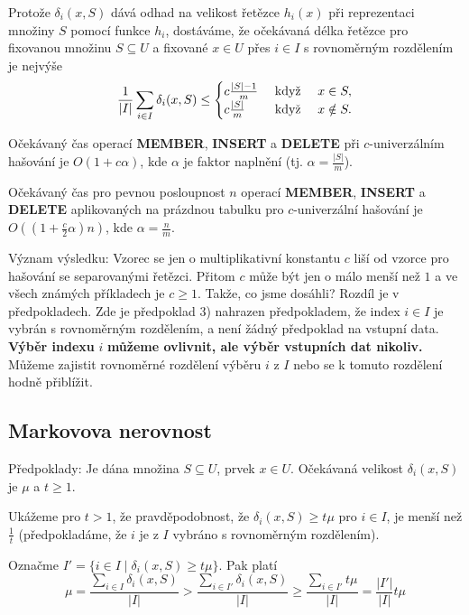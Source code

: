 \documentclass[a4paper,12pt]{article}
\begin{document}
Protože $\delta_i(x,S)$ dává odhad na velikost řetězce $
h_i(x)$ při 
repre\-zentaci množiny $S$ pomocí funkce $h_i$, dostáváme, že 
očekávaná délka řetězce pro fixovanou množinu  
$S\subseteq U$ a fixované $x\in U$ přes $i\in I$ s rovnoměrným 
rozdělením je nejvýše
$$\frac 1{|I|}\sum_{i\in I}\delta_i(x,S)\le\begin{cases} c\frac {|S|-1}m&\text{\rm\ když }
\quad x\in S,\\
c\frac {|S|}m&\text{\rm\ když }\quad x\notin S.\end{cases} $$

\begin{veta}Očekávaný čas operací {\bf MEMBER}, {\bf INSERT }
a {\bf DE\-LETE} při $c$-univerzálním hašování je $
O(1+c\alpha )$, kde 
$\alpha$ je faktor napl\-nění (tj. $\alpha =\frac {|S|}m$).

Očekávaný čas pro pevnou posloupnost $n$ operací 
{\bf MEMBER}, {\bf INSERT} a {\bf DELETE} aplikovaných na prázdnou ta\-bulku 
pro $c$-univerzální hašování je $O((1+\frac c2\alpha 
)n)$, kde $\alpha =\frac nm$.  
\end{veta}

Význam výsledku:  Vzorec se jen o multiplikativní 
konstantu $c$ liší od vzorce pro hašování se separovanými 
řetězci.  Přitom $c$ může být jen o málo menší než $
1$ a 
ve všech známých příkla\-dech je $c\ge 1$.  Takže, co jsme 
dosáhli?  Rozdíl je v předpokla\-dech.  Zde je předpoklad 3) 
nahrazen předpokladem, že index $i\in I$ je vybrán s 
rovnoměrným rozdělením, a není žádný předpoklad na vstupní 
data.  {\bf Výběr indexu} $i$ {\bf můžeme ov\-liv\-nit, ale výběr 
vstupních dat nikoliv.}  Můžeme zajistit rovno\-měr\-né 
rozdělení výběru $i$ z $I$ nebo se k tomuto rozdělení hodně 
přiblížit.  

\subsection{
Markovova nerovnost
}

Předpoklady: Je dána množina $S\subseteq U$, prvek $
x\in U$. 
Očeká\-va\-ná velikost $\delta_i(x,S)$ je $\mu$ a $t\ge 
1$.

Ukážeme pro $t>1$, že pravděpodobnost, že $
\delta_i(x,S)\ge t\mu$ 
pro $i\in I$, je menší než $\frac 1t$ (předpokladáme, že $
i$ je z $I$ vybráno s 
rovnoměrným rozdělením).  

Označme $I'=\{i\in I\mid\delta_i(x,S)\ge t\mu \}$. Pak platí
$$\mu =\frac {\sum_{i\in I}\delta_i(x,S)}{|I|}>\frac {\sum_{i\in 
I'}\delta_i(x,S)}{|I|}\ge\frac {\sum_{i\in I'}t\mu}{|I|}=\frac {|
I'|}{|I|}t\mu$$
\end{document}
